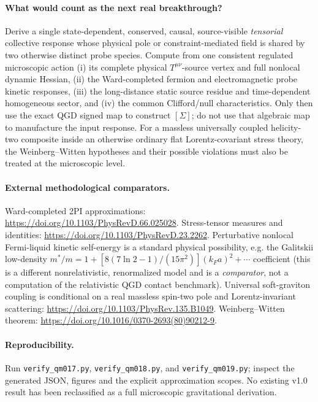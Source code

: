 \documentclass[11pt,a4paper]{article}
\begin{document}
\paragraph{What would count as the next real breakthrough?}
Derive a single state-dependent, conserved, causal, source-visible \emph{tensorial} collective response whose physical pole or constraint-mediated field is shared by two otherwise distinct probe species. Compute from one consistent regulated microscopic action (i) its complete physical $T^{\mu\nu}$-source vertex and full nonlocal dynamic Hessian, (ii) the Ward-completed fermion and electromagnetic probe kinetic responses, (iii) the long-distance static source residue and time-dependent homogeneous sector, and (iv) the common Clifford/null characteristics. Only then use the exact QGD signed map to construct $[\Sigma]$; do not use that algebraic map to manufacture the input response. For a massless universally coupled helicity-two composite inside an otherwise ordinary flat Lorentz-covariant stress theory, the Weinberg--Witten hypotheses and their possible violations must also be treated at the microscopic level.

\paragraph{External methodological comparators.} Ward-completed 2PI approximations: \url{https://doi.org/10.1103/PhysRevD.66.025028}. Stress-tensor measures and identities: \url{https://doi.org/10.1103/PhysRevD.23.2262}. Perturbative nonlocal Fermi-liquid kinetic self-energy is a standard physical possibility, e.g. the Galitskii low-density $m^*/m=1+[8(7\ln2-1)/(15\pi^2)](k_Fa)^2+\cdots$ coefficient (this is a different nonrelativistic, renormalized model and is a \emph{comparator}, not a computation of the relativistic QGD contact benchmark). Universal soft-graviton coupling is conditional on a real massless spin-two pole and Lorentz-invariant scattering: \url{https://doi.org/10.1103/PhysRev.135.B1049}. Weinberg--Witten theorem: \url{https://doi.org/10.1016/0370-2693(80)90212-9}.

\paragraph{Reproducibility.} Run \texttt{verify\_qm017.py}, \texttt{verify\_qm018.py}, and \texttt{verify\_qm019.py}; inspect the generated JSON, figures and the explicit approximation scopes. No existing v1.0 result has been reclassified as a full microscopic gravitational derivation.
\end{document}
